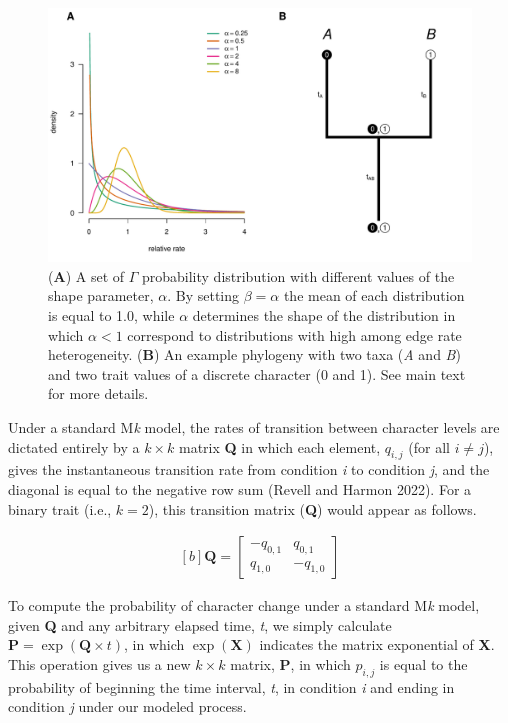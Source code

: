 \documentclass[fleqn,10pt,lineno]{wlpeerj} %
\begin{document}
\begin{figure}
\includegraphics[width=1\linewidth]{Revell-and-Harmon.fitgammaMk.PeerJ_files/figure-latex/Revell-and-Harmon-fig1-1} \caption{(\textbf{A}) A set of $\Gamma$ probability distribution with different values of the shape parameter, $\alpha$. By setting $\beta = \alpha$ the mean of each distribution is equal to 1.0, while $\alpha$ determines the shape of the distribution in which $\alpha < 1$ correspond to distributions with high among edge rate heterogeneity. (\textbf{B}) An example phylogeny with two taxa (\emph{A} and \emph{B}) and two trait values of a discrete character (0 and 1). See main text for more details.}\label{fig:Revell-and-Harmon-fig1}
\end{figure}

Under a standard M\emph{k} model, the rates of transition between character levels are dictated entirely by a \(k \times k\) matrix \textbf{Q} in which each element, \(q_{i,j}\) (for all \(i \neq j\)), gives the instantaneous transition rate from condition \emph{i} to condition \emph{j}, and the diagonal is equal to the negative row sum (Revell and Harmon 2022). For a binary trait (i.e., \(k = 2\)), this transition matrix (\textbf{Q}) would appear as follows.

\begin{equation}
\begin{aligned}[b]
\mathbf{Q} = \begin{bmatrix} -q_{0,1} & q_{0,1} \\ q_{1,0} & -q_{1,0} \end{bmatrix}
\end{aligned}
\end{equation}

To compute the probability of character change under a standard M\emph{k} model, given \textbf{Q} and any arbitrary elapsed time, \emph{t}, we simply calculate \(\mathbf{P} = \exp(\mathbf{Q} \times t)\), in which \(\exp(\mathbf{X})\) indicates the matrix exponential of \textbf{X}. This operation gives us a new \(k \times k\) matrix, \textbf{P}, in which \(p_{i,j}\) is equal to the probability of beginning the time interval, \emph{t}, in condition \emph{i} and ending in condition \emph{j} under our modeled process.
\end{document}
